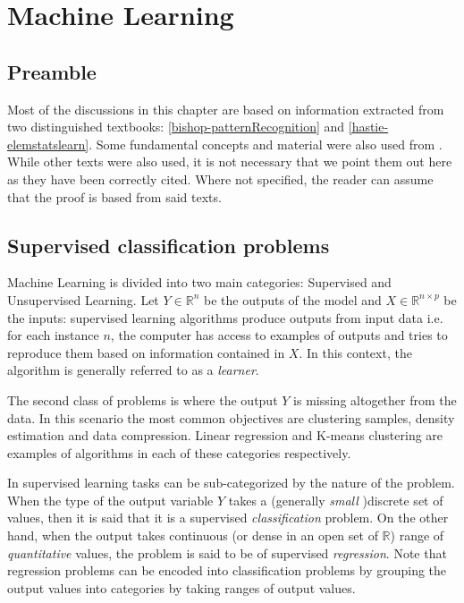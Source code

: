 \chapter{Machine Learning}
\label{cha:machine_learning}


\section{Preamble}\label{section-preamble}
Most of the discussions in this chapter are based on information extracted from two distinguished textbooks: \cref{bishop-patternRecognition} and \cref{hastie-elemstatslearn}. Some fundamental concepts and material were also used from \label{scikit-learn}. While other texts were also used, it is not necessary that we point them out here as they have been correctly cited. Where not specified, the reader can assume that the proof is based from said texts.

\section{ Supervised classification problems}\label{section-supervised-learning}

Machine Learning is divided into two main categories: Supervised and Unsupervised Learning. Let $Y \in \mathbb{R}^n$ be the outputs of the model and $X \in \mathbb{R}^{n \times p}$ be the inputs: supervised learning algorithms produce outputs from input data i.e. for each instance $n$, the computer has access to examples of outputs and tries to reproduce them based on information contained in $X$. In this context, the algorithm is generally referred to as a \textit{learner}.

The second class of problems is where the output $Y$ is missing altogether from the data. In this scenario the most common objectives are clustering samples, density estimation and data compression. Linear regression and K-means clustering are examples of algorithms in each of these categories respectively.

In supervised learning tasks can be sub-categorized by the nature of the problem. When the type of the output variable $Y$ takes a (generally \textit{small} )discrete set of values, then it is said that it is a supervised \textit{classification} problem. On the other hand, when the output takes continuous (or dense in an open set of $\mathbb{R}$) range of \textit{quantitative} values, the problem is said to be of supervised \textit{regression}. Note that regression problems can be encoded into classification problems by grouping the output values into categories by taking ranges of output values.

